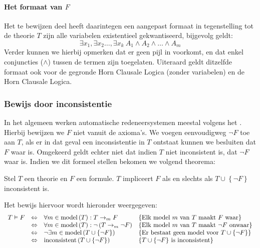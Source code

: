 \paragraph{Het formaat van $F$}
Het te bewijzen deel heeft daarintegen een aangepast formaat in tegenstelling tot de theorie $T$ zijn alle variabelen existentieel gekwantiseerd, bijgevolg geldt:
\begin{equation}
\exists x_1,\exists x_2\ldots,\exists x_k\ A_1\wedge A_2\wedge\ldots\wedge A_m
\end{equation}
Verder kunnen we hierbij opmerken dat er geen pijl in voorkomt, en dat enkel conjuncties ($\wedge$) tussen de termen zijn toegelaten. Uiteraard geldt ditzelfde formaat ook voor de gegronde Horn Clausale Logica (zonder variabelen) en de Horn Clausale Logica.
\subsubsection{Bewijs door inconsistentie}
\label{sss:inconsistenceProof}
In het algemeen werken automatische redeneersystemen meestal volgens het . Hierbij bewijzen we $F$ niet vanuit de axioma's. We voegen eenvoudigweg $\neg F$ toe aan $T$, als er in dat geval een inconsistentie in $T$ ontstaat kunnen we besluiten dat $F$ waar is. Omgekeerd geldt echter niet dat indien $T$ niet inconsistent is, dat $\neg F$ waar is. Indien we dit formeel stellen bekomen we volgend theorema:
\begin{theorem}
Stel $T$ een theorie en $F$ een formule. $T$ impliceert $F$ als en slechts als $T\cup\left\{\neg F\right\}$ inconsistent is.
\end{theorem}
Het bewijs hiervoor wordt hieronder weergegeven:
\begin{equation}
\begin{array}{rcll}
T\vDash F&\Leftrightarrow&\forall m\in\mbox{model}\left( T \right):T\displaystyle\rightarrow_mF&\mbox{\{Elk model $m$ van $T$ maakt $F$ waar\}}\\
&\Leftrightarrow&\forall m\in\mbox{model}\left( T \right):\neg\left(T\displaystyle\rightarrow_m\neg F\right)&\mbox{\{Elk model $m$ van $T$ maakt $\neg F$ onwaar\}}\\
&\Leftrightarrow&\neg\exists m\in\mbox{model}\left( T\cup\left\{\neg F\right\} \right)&\mbox{\{Er bestaat geen model voor $T\cup\left\{\neg F\right\}$\}}\\
&\Leftrightarrow&\mbox{inconsistent}\left( T\cup\left\{\neg F\right\} \right)&\mbox{\{$T\cup\left\{\neg F\right\}$ is inconsistent\}}
\end{array}
\end{equation}
